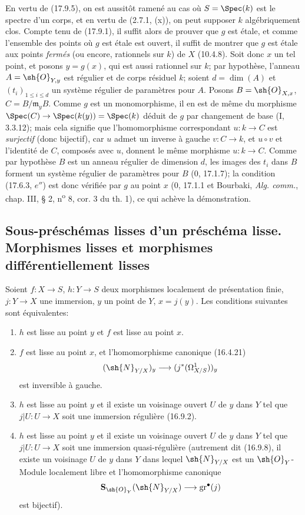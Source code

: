 En vertu de (17.9.5), on est aussitôt ramené au cas où $S=\Spec(k)$ est le spectre d'un corps, et en vertu de (2.7.1, (x)), on peut supposer $k$ algébriquement clos. Compte tenu de (17.9.1), il suffit alors de prouver que $g$ est étale, et comme l'ensemble des points où $g$ est étale est ouvert, il suffit de montrer que $g$ est étale aux points \emph{fermés} (ou encore, rationnels sur $k$) de $X$ (10.4.8). Soit donc $x$ un tel point, et posons $y=g(x)$, qui est aussi rationnel sur $k$; par hypothèse, l'anneau $A=\sh{O}_{Y,y}$ est régulier et de corps résiduel $k$; soient $d=\dim(A)$ et $(t_i)_{1\leq i\leq d}$ un système régulier de paramètres pour $A$. Posons $B=\sh{O}_{X,x}$, $C=B/\mathfrak m_yB$. Comme $g$ est un monomorphisme, il en est de même du morphisme $\Spec(C)\to\Spec(k(y))=\Spec(k)$ déduit de $g$ par changement de base (I, 3.3.12); mais cela signifie que l'homomorphisme correspondant $u:k\to C$ est \emph{surjectif} (donc bijectif), car $u$ admet un inverse à gauche $v:C\to k$, et $u\circ v$ et l'identité de $C$, composés avec $u$, donnent le même morphisme $u:k\to C$. Comme par hypothèse $B$ est un anneau régulier de dimension $d$, les images des $t_i$ dans $B$ forment un système régulier de paramètres pour $B$ (0, 17.1.7); la condition (17.6.3, $e''$) est donc vérifiée par $g$ au point $x$ (0, 17.1.1 et Bourbaki, \emph{Alg. comm.}, chap. III, § 2, n\textsuperscript{o} 8, cor. 3 du th. 1), ce qui achève la démonstration.

\subsection{Sous-préschémas lisses d'un préschéma lisse. Morphismes lisses et morphismes différentiellement lisses}
\label{subsection:IV.17.12}

\begin{theorem}[17.12.1]
\label{IV.17.12.1}
Soient $f:X\to S$, $h:Y\to S$ deux morphismes localement de présentation finie, $j:Y\to X$ une immersion, $y$ un point de $Y$, $x=j(y)$. Les conditions suivantes sont équivalentes:
\begin{enumerate}
  \item[a)] $h$ est lisse au point $y$ et $f$ est lisse au point $x$.
  \item[b)] $f$ est lisse au point $x$, et l'homomorphisme canonique (16.4.21)
  \[
  (\sh{N}_{Y/X})_y\to(j^*(\Omega^1_{X/S}))_y
  \]
  est inversible à gauche.
  \item[c)] $h$ est lisse au point $y$ et il existe un voisinage ouvert $U$ de $y$ dans $Y$ tel que $j|U:U\to X$ soit une immersion régulière (16.9.2).


  \item[c')] $h$ est lisse au point $y$ et il existe un voisinage ouvert $U$ de $y$ dans $Y$ tel que $j|U:U\to X$ soit une immersion quasi-régulière (autrement dit (16.9.8), il existe un voisinage $U$ de $y$ dans $Y$ dans lequel $\sh{N}_{Y/X}$ est un $\sh{O}_Y$-Module localement libre et l'homomorphisme canonique
  \[
  \mathbf{S}_{\sh{O}_Y}(\sh{N}_{Y/X})\to\operatorname{gr}^{\bullet}(j)
  \]
  est bijectif).
\end{enumerate}
\end{theorem}

